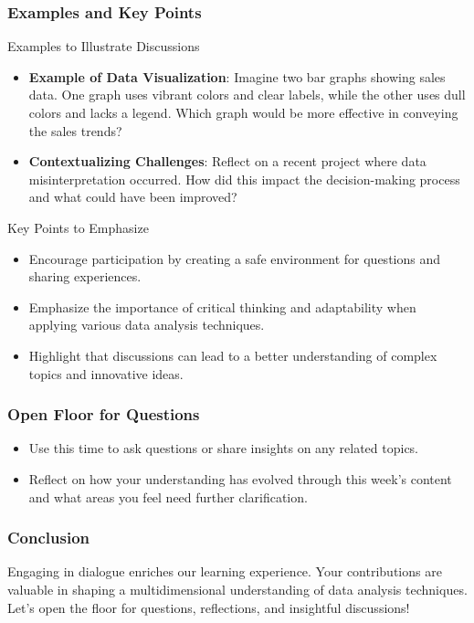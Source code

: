 \documentclass[aspectratio=169]{beamer}
\begin{document}
\begin{frame}[fragile]
  \frametitle{Examples and Key Points}
  \begin{block}{Examples to Illustrate Discussions}
    \begin{itemize}
      \item \textbf{Example of Data Visualization}: Imagine two bar graphs showing sales data. One graph uses vibrant colors and clear labels, while the other uses dull colors and lacks a legend. Which graph would be more effective in conveying the sales trends? 
      \item \textbf{Contextualizing Challenges}: Reflect on a recent project where data misinterpretation occurred. How did this impact the decision-making process and what could have been improved?
    \end{itemize}
  \end{block}

  \begin{block}{Key Points to Emphasize}
    \begin{itemize}
      \item Encourage participation by creating a safe environment for questions and sharing experiences.
      \item Emphasize the importance of critical thinking and adaptability when applying various data analysis techniques.
      \item Highlight that discussions can lead to a better understanding of complex topics and innovative ideas.
    \end{itemize}
  \end{block}
\end{frame}

\begin{frame}[fragile]
  \frametitle{Open Floor for Questions}
  \begin{itemize}
    \item Use this time to ask questions or share insights on any related topics.
    \item Reflect on how your understanding has evolved through this week's content and what areas you feel need further clarification.
  \end{itemize}
\end{frame}

\begin{frame}[fragile]
  \frametitle{Conclusion}
  Engaging in dialogue enriches our learning experience. Your contributions are valuable in shaping a multidimensional understanding of data analysis techniques. Let’s open the floor for questions, reflections, and insightful discussions!
\end{frame}
\end{document}
